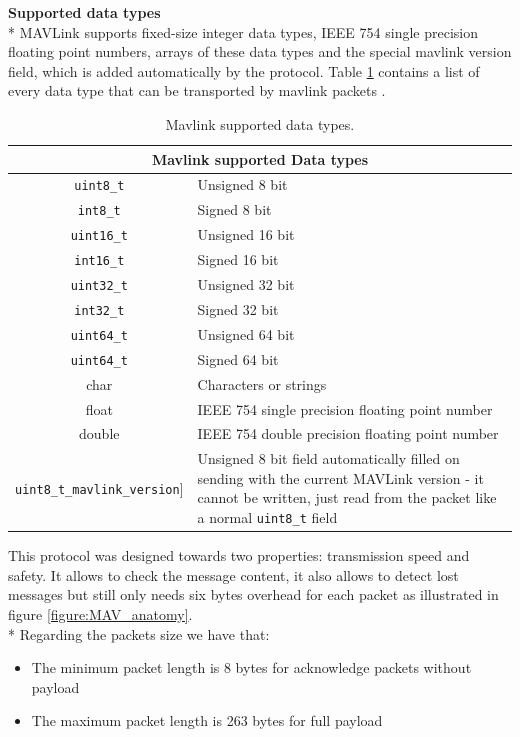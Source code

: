 \noindent
\textbf{Supported data types} \\* 
\noindent
MAVLink supports fixed-size integer data types, IEEE 754 single precision floating point numbers, arrays of these data types and the special mavlink version field, which is added automatically by the protocol. Table \ref{tab:mavlink} contains a list of every data type that can be transported by mavlink packets \cite{MAVLink}.\par
\begin{table}
\centering
\begin{tabular}{c | p{6cm}}
\multicolumn{2}{c}{\large Mavlink supported Data types}\\
\hline
 \texttt{uint8\_t} &  Unsigned 8 bit\\
 \texttt{int8\_t} & Signed 8 bit\\
 \texttt{uint16\_t} &  Unsigned 16 bit\\
 \texttt{int16\_t} & Signed 16 bit\\
 \texttt{uint32\_t} & Unsigned 32 bit\\
 \texttt{int32\_t} & Signed 32 bit \\
 \texttt{uint64\_t} & Unsigned 64 bit \\
 \texttt{uint64\_t} &  Signed 64 bit \\
 \hline
 char & Characters or strings\\
 float & IEEE 754 single precision floating point number\\
 double & IEEE 754 double precision floating point number\\
 \hline
 \texttt{uint8\_t\_mavlink\_version}] & Unsigned 8 bit field automatically filled on sending with the current MAVLink version - it cannot be written, just read from the packet like a normal \texttt{uint8\_t} field
\end{tabular}
\caption[Mavlink types]{Mavlink supported data types.}
\label{tab:mavlink}
\end{table}
This protocol was designed towards two properties: transmission speed and safety. It allows to check the message content, it also allows to detect lost messages but still only needs six bytes overhead for each packet as illustrated in figure \ref{figure:MAV_anatomy}. \\*
\noindent
Regarding the packets size we have that:

\begin{itemize}
\item The minimum packet length is 8 bytes for acknowledge packets without payload
\item The maximum packet length is 263 bytes for full payload
\end{itemize}

